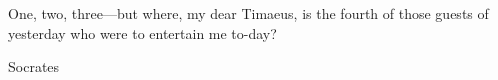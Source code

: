 \epigraph{One, two, three---but where, my dear Timaeus, is the fourth of those guests of yesterday who were to entertain me to-day?}{Socrates}